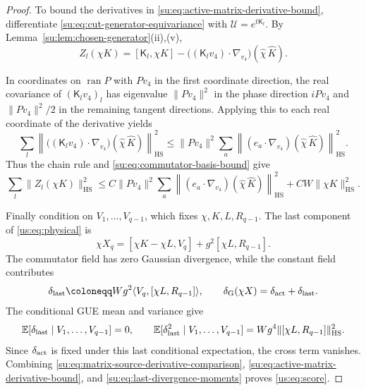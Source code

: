 \documentclass[11pt]{article}
\numberwithin{equation}{section}
\theoremstyle{remark}
\newcommand{\E}{\mathbb E}
\newcommand{\ran}{\operatorname{ran}}
\newcommand{\HS}{\mathrm{HS}}
\begin{document}
\begin{proof}
To bound the derivatives in \eqref{su:eq:active-matrix-derivative-bound},
differentiate \eqref{su:eq:cut-generator-equivariance} with
$\mathcal U=e^{t\mathsf K_l}$. By Lemma~\ref{su:lem:chosen-generator}(ii),(v),
\[
 Z_l(\chi K)=[\mathsf K_l,\chi K]
       -\bigl((\mathsf K_lv_4)\cdot\nabla_{v_4}\bigr)
          (\widehat\chi\,\widehat K).
\]

In coordinates on $\ran P$
with $Pv_4$ in the first coordinate direction, the real covariance of
$(\mathsf K_lv_4)_l$ has eigenvalue $\|Pv_4\|^2$ in the phase direction
$iPv_4$ and $\|Pv_4\|^2/2$ in the remaining tangent directions.
Applying this to each real coordinate of the derivative yields
\[
 \sum_l\left\|\bigl((\mathsf K_lv_4)\cdot\nabla_{v_4}\bigr)
            (\widehat\chi\,\widehat K)\right\|_{\HS}^2
 \le\|Pv_4\|^2\sum_a
       \left\|(e_a\cdot\nabla_{v_4})(\widehat\chi\,\widehat K)\right\|_{\HS}^2.
\]
Thus the chain rule and \eqref{su:eq:commutator-basis-bound} give
\begin{equation}\label{su:eq:matrix-source-derivative-comparison}
 \sum_l\|Z_l(\chi K)\|_{\HS}^2
 \le C\|Pv_4\|^2\sum_a
       \left\|(e_a\cdot\nabla_{v_4})(\widehat\chi\,\widehat K)\right\|_{\HS}^2
       +CW\|\chi K\|_{\HS}^2.
\end{equation}

Finally condition on $V_1,\ldots,V_{q-1}$, which fixes $\chi,K,L,R_{q-1}$.
The last component of \eqref{us:eq:physical} is
\[
 \chi X_q=[\chi K-\chi L,V_q]+g^2[\chi L,R_{q-1}].
\]
The commutator field has zero Gaussian divergence, while the constant
field contributes
\[
 \delta_{\rm last}\coloneqq Wg^2\langle V_q,[\chi L,R_{q-1}]\rangle,\qquad
 \delta_{\rm G}(\chi X)=\delta_{\rm act}+\delta_{\rm last}.
\]
The conditional GUE mean and variance give
\begin{equation}\label{su:eq:last-divergence-moments}
 \E[\delta_{\rm last}\mid V_1,\ldots,V_{q-1}]=0,\qquad
 \E[\delta_{\rm last}^2\mid V_1,\ldots,V_{q-1}]
       =Wg^4\|[\chi L,R_{q-1}]\|_{\HS}^2.
\end{equation}
Since $\delta_{\rm act}$ is fixed under this last conditional expectation,
the cross term vanishes. Combining
\eqref{su:eq:matrix-source-derivative-comparison},
\eqref{su:eq:active-matrix-derivative-bound}, and
\eqref{su:eq:last-divergence-moments} proves \eqref{us:eq:score}.
\end{proof}
\end{document}
